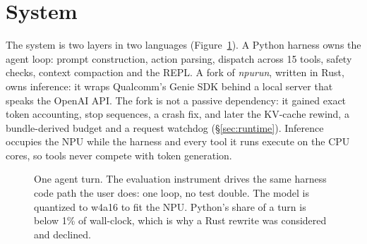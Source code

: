 \documentclass[11pt]{article}
\begin{document}
\section{System}

The system is two layers in two languages (Figure~\ref{fig:arch}). A Python
harness owns the agent loop: prompt construction, action parsing, dispatch
across 15 tools, safety checks, context compaction and the REPL. A fork of
\emph{npurun}, written in Rust, owns inference: it wraps Qualcomm's Genie SDK
behind a local server that speaks the OpenAI API. The fork is not a passive
dependency: it gained exact token accounting, stop sequences, a crash fix,
and later the KV-cache rewind, a bundle-derived budget and a request
watchdog (\S\ref{sec:runtime}). Inference occupies the NPU while the harness
and every tool it runs execute on the CPU cores, so tools never compete with
token generation.

\begin{figure}[ht]
\centering
{}
\caption{One agent turn. The evaluation instrument drives the same harness
code path the user does: one loop, no test double. The model is quantized to
w4a16 to fit the NPU. Python's share of a turn is below 1\% of wall-clock,
which is why a Rust rewrite was considered and declined.}
\label{fig:arch}
\end{figure}
\end{document}
